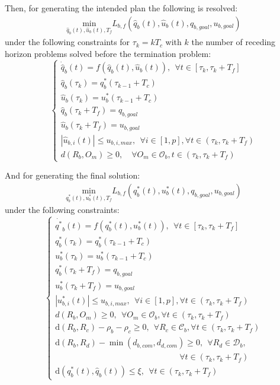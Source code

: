 Then, for generating the intended plan the following is resolved:
\begin{align}\label{eq:costsa}
\underset{\hat{q}_b(t),\hat{u}_b(t),T_f}{\mathrm{min}} L_{b,f}(\hat{q}_b(t), \hat{u}_b(t), q_{b,goal},u_{b,goal})
\end{align}
under the following constraints for $\tau_k = kT_c$ with $k$ the number of receding horizon
problems solved before the termination problem:
\begin{equation}\label{eq:constsa}
\left\lbrace\begin{array}{lcl}
    \dot{\hat{q}}_b(t) = f(\hat{q}_b(t),\hat{u}_b(t)),\ \ \forall t \in [\tau_{k}, \tau_{k}+T_f]\\
    \hat{q}_b(\tau_{k}) = q^*_{b}(\tau_{k-1}+T_c)\\
    \hat{u}_b(\tau_{k}) = u^*_{b}(\tau_{k-1}+T_c)\\
    \hat{q}_b(\tau_{k}+T_f) = q_{b,goal}\\
    \hat{u}_b(\tau_{k}+T_f) = u_{b,goal}\\
    |\hat{u}_{b,i}(t)| \leq u_{b,i,max},\ \ \forall i \in [1,p],\forall t \in (\tau_{k}, \tau_{k}+T_f)\\
    d(R_b, O_m) \geq 0,\quad \forall O_m \in \mathcal{O}_b, t \in (\tau_{k}, \tau_{k}+T_f)
\end{array}\right.
\end{equation}

And for generating the final solution:
\begin{align}\label{eq:cost}
\underset{q^*_b(t),u^*_b(t),T_f}{\mathrm{min}} L_{b,f}(q^*_b(t), u^*_b(t), q_{b,goal},u_{b,goal})
\end{align}
under the following constraints:
\begin{equation}\label{eq:const}
\left\lbrace\begin{array}{lcl}
    \dot{q^*}_b(t) = f(q^*_b(t),u^*_b(t)),\ \ \forall t \in [\tau_{k}, \tau_{k}+T_f]\\
    q^*_b(\tau_{k}) = q^*_{b}(\tau_{k-1}+T_c)\\
    u^*_b(\tau_{k}) = u^*_{b}(\tau_{k-1}+T_c)\\
    q^*_b(\tau_{k}+T_f) = q_{b,goal}\\
    u^*_b(\tau_{k}+T_f) = u_{b,goal}\\
    |u^*_{b,i}(t)| \leq u_{b,i,max},\ \ \forall i \in [1,p],\forall t \in (\tau_{k}, \tau_{k}+T_f)\\
    d(R_b, O_m) \geq 0,\ \ \forall O_m \in \mathcal{O}_b, \forall t \in (\tau_{k}, \tau_{k}+T_f)\\
    \mathrm{d}(R_b, R_c) - \rho_b - \rho_c \geq 0,\ \ \forall R_c \in \mathcal{C}_b, \forall t \in (\tau_{k}, \tau_{k}+T_f)\\
    \mathrm{d}(R_b, R_d) - \min(d_{b,com},d_{d,com}) \geq 0,\ \ \forall R_d \in \mathcal{D}_b,\\
    \quad \quad \quad \quad \quad \quad \quad \quad \quad \quad \quad \quad \quad \quad \quad \forall t \in (\tau_{k}, \tau_{k}+T_f)\\
    \mathrm{d}(q^*_b(t), \hat{q}_b(t)) \leq \xi,\ \ \forall t \in (\tau_{k}, \tau_{k}+T_f)
\end{array}\right.
\end{equation}

